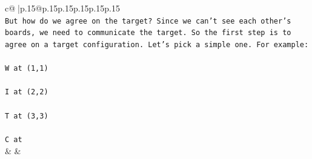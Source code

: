 \documentclass{article}
\begin{document}
{\begin{supertabular}{c@{$\;$}|p{.15\linewidth}@{}p{.15\linewidth}p{.15\linewidth}p{.15\linewidth}p{.15\linewidth}p{.15\linewidth}}
{{{\\ 
\texttt{But how do we agree on the target? Since we can't see each other's boards, we need to communicate the target. So the first step is to agree on a target configuration. Let's pick a simple one. For example:} \\
\\ 
\texttt{W at (1,1)} \\
\\ 
\texttt{I at (2,2)} \\
\\ 
\texttt{T at (3,3)} \\
\\ 
\texttt{C at} \\
            }
        }
    }
    & & \\ \\


\end{supertabular}}
\end{document}
